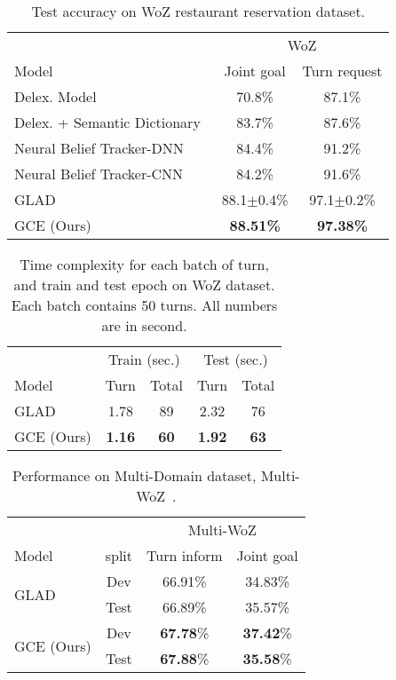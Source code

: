 \documentclass{article}
\begin{document}
\renewcommand{\tabcolsep}{0.04cm}
\begin{table}[h!]
\caption{Test accuracy on WoZ restaurant reservation dataset.}
\label{tab:woz}
\centering
\begin{tabular}{lcc}
\toprule
 &  \multicolumn{2}{c}{WoZ} \\
Model & Joint goal & Turn request\\
\toprule
 \small Delex. Model~\citep{Mrksic2017NeuralBT} & 70.8\% & 87.1\% \\
 \small Delex. + Semantic Dictionary~\citep{Mrksic2017NeuralBT} & 83.7\% & 87.6\% \\
 \small Neural Belief Tracker-DNN~\citep{Mrksic2017NeuralBT} & 84.4\% & 91.2\% \\
\small Neural Belief Tracker-CNN~\citep{Wen2017ANE} & 84.2\% & 91.6\% \\
\small GLAD~\citep{Zhong2018GlobalLocallySD} & 88.1$\pm$0.4\% &  97.1$\pm$0.2\% \\
\small GCE (Ours) & \textbf{88.51\%} & \textbf{97.38\%} \\
\bottomrule
\end{tabular}
\end{table}


\renewcommand{\tabcolsep}{0.3cm}
 \begin{table}
\caption{Time complexity for each batch of turn, and train and test epoch on WoZ dataset. Each batch contains 50 turns. All numbers are in second.}
\label{tab:time}
\centering
\begin{tabular}{lcccc}
\toprule
 &  \multicolumn{2}{c}{Train (sec.)} & \multicolumn{2}{c}{Test (sec.)}\\
Model & Turn & Total & Turn & Total \\
\toprule
\small GLAD~\citep{Zhong2018GlobalLocallySD} &  1.78 & 89 & 2.32 & 76 \\
\small GCE (Ours) & \textbf{1.16} & \textbf{60} &  \textbf{1.92} & \textbf{63} \\
\bottomrule
\end{tabular}
\end{table}

\begin{table}[t!]
\caption{Performance on Multi-Domain dataset, Multi-WoZ~\citep{Budzianowski2018MultiWOZA}. 
}
\label{tab:mwoz}
\centering
\begin{tabular}{lccc}
\toprule
& &  \multicolumn{2}{c}{Multi-WoZ} \\
Model & split & Turn inform & Joint goal \\
\toprule
\multirow{2}{*}{\small GLAD~\citep{Zhong2018GlobalLocallySD}} & Dev & 66.91\% & 34.83\% \\
& \small Test & 66.89\% & 35.57\% \\
\midrule
\multirow{2}{*}{\small GCE (Ours)} &  Dev & \textbf{67.78}\% & \textbf{37.42}\% \\
& \small Test & \textbf{67.88}\% & \textbf{35.58}\% \\
\bottomrule
\end{tabular}
\end{table}
\end{document}
